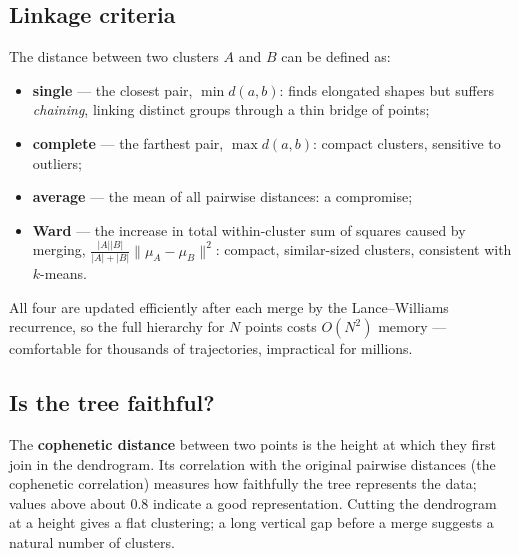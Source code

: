 \documentclass[11pt]{article}
\begin{document}
\subsection{Linkage criteria}
The distance between two clusters $A$ and $B$ can be defined as:
\begin{itemize}
\item \textbf{single} --- the closest pair, $\min d(a,b)$: finds elongated shapes but suffers \emph{chaining}, linking distinct groups through a thin bridge of points;
\item \textbf{complete} --- the farthest pair, $\max d(a,b)$: compact clusters, sensitive to outliers;
\item \textbf{average} --- the mean of all pairwise distances: a compromise;
\item \textbf{Ward} --- the increase in total within-cluster sum of squares caused by merging, $\frac{|A||B|}{|A|+|B|}\|\mu_A-\mu_B\|^2$: compact, similar-sized clusters, consistent with $k$-means.
\end{itemize}
All four are updated efficiently after each merge by the Lance--Williams recurrence, so the full hierarchy for $N$ points costs $O(N^2)$ memory --- comfortable for thousands of trajectories, impractical for millions.
\subsection{Is the tree faithful?}
The \textbf{cophenetic distance} between two points is the height at which they first join in the dendrogram. Its correlation with the original pairwise distances (the cophenetic correlation) measures how faithfully the tree represents the data; values above about 0.8 indicate a good representation. Cutting the dendrogram at a height gives a flat clustering; a long vertical gap before a merge suggests a natural number of clusters.
\end{document}
